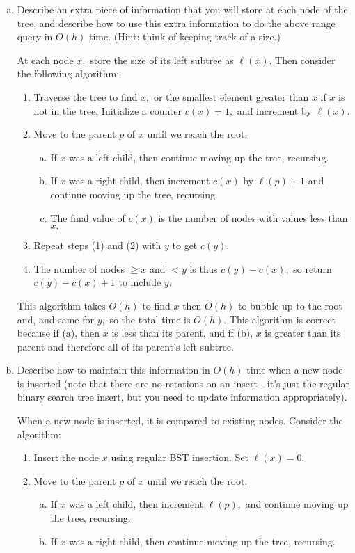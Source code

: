 \documentclass{article}
\begin{document}
\begin{enumerate}[(a)]
	\item Describe an extra piece of information that you will store at each node of the tree, and describe how to use this extra information to do the above range query in $O(h)$ time. (Hint: think of keeping track of a size.)
		\begin{soln}
			At each node $x,$ store the size of its left subtree as $\ell(x).$ Then consider the following algorithm:
			\begin{enumerate}[(1)]
				\item Traverse the tree to find $x,$ or the smallest element greater than $x$ if $x$ is not in the tree. Initialize a counter $c(x)= 1,$ and increment by $\ell(x).$
				\item Move to the parent $p$ of $x$ until we reach the root.
					\begin{enumerate}[(a)]
						\item If $x$ was a left child, then continue moving up the tree, recursing.
						\item If $x$ was a right child, then increment $c(x)$ by $\ell(p)+1$ and continue moving up the tree, recursing. 
						\item The final value of $c(x)$ is the number of nodes with values less than $x.$
					\end{enumerate}
				\item Repeat steps (1) and (2) with $y$ to get $c(y).$
				\item The number of nodes $\ge x$ and $<y$ is thus $c(y)-c(x),$ so return $c(y)-c(x)+1$ to include $y.$
			\end{enumerate}

			This algorithm takes $O(h)$ to find $x$ then $O(h)$ to bubble up to the root and, and same for $y,$ so the total time is $O(h).$ This algorithm is correct because if (a), then $x$ is less than its parent, and if (b), $x$ is greater than its parent and therefore all of its parent's left subtree. 
		\end{soln}

	\item Describe how to maintain this information in $O(h)$ time when a new node is inserted (note that there are no rotations on an insert - it's just the regular binary search tree insert, but you need to update information appropriately).
		\begin{soln}
			When a new node is inserted, it is compared to existing nodes. Consider the algorithm:
			\begin{enumerate}[(1)]
				\item Insert the node $x$ using regular BST insertion. Set $\ell(x)=0.$
				\item Move to the parent $p$ of $x$ until we reach the root.
					\begin{enumerate}[(a)]
						\item If $x$ was a left child, then increment $\ell(p),$ and continue moving up the tree, recursing.
						\item If $x$ was a right child, then continue moving up the tree, recursing.
					\end{enumerate}
			\end{enumerate}


\end{soln}
\end{enumerate}
\end{document}
